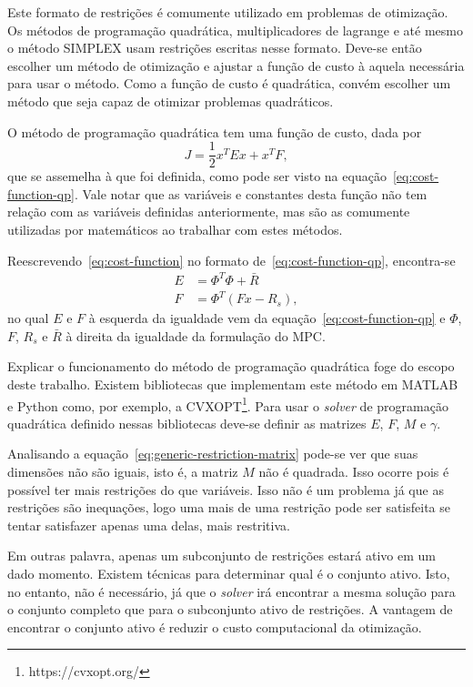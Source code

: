 Este formato de restrições é comumente utilizado em problemas de otimização. Os
métodos de programação quadrática, multiplicadores de lagrange e até mesmo o
método SIMPLEX usam restrições escritas nesse formato. Deve-se então escolher um
método de otimização e ajustar a função de custo à aquela necessária para usar o
método. Como a função de custo é quadrática, convém escolher um método que seja
capaz de otimizar problemas quadráticos.

O método de programação quadrática tem uma função de custo, dada por
%
\begin{equation}
	\label{eq:cost-function-qp}
	J = \frac{1}{2} x^T Ex + x^T F,
\end{equation}
%
que se assemelha à que foi definida, como pode ser visto na
equação~\eqref{eq:cost-function-qp}. Vale notar que as variáveis e constantes
desta função não tem relação com as variáveis definidas anteriormente, mas são
as comumente utilizadas por matemáticos ao trabalhar com estes métodos.

Reescrevendo~\eqref{eq:cost-function} no formato de~\eqref{eq:cost-function-qp},
encontra-se
%
\begin{align}
	\label{eq:cost-function-qp-constants}
	E & = \Phi^T \Phi + \bar{R} \\
	F & = \Phi^T (Fx - R_s),
\end{align}
%
no qual \( E \) e \( F \) à esquerda da igualdade vem da
equação~\eqref{eq:cost-function-qp} e \( \Phi \), \( F \), \( R_s \) e \(\bar{R}
\) à direita da igualdade da formulação do \ac{MPC}.

Explicar o funcionamento do método de programação quadrática foge do escopo
deste trabalho. Existem bibliotecas que implementam este método em MATLAB e
Python como, por exemplo, a CVXOPT\footnote{https://cvxopt.org/}. Para usar o
\textit{solver} de programação quadrática definido nessas bibliotecas deve-se
definir as matrizes \( E \), \( F \), \( M \) e \( \gamma \).

Analisando a equação~\eqref{eq:generic-restriction-matrix} pode-se ver que suas
dimensões não são iguais, isto é, a matriz \( M \) não é quadrada. Isso ocorre
pois é possível ter mais restrições do que variáveis. Isso não é um problema já
que as restrições são inequações, logo uma mais de uma restrição pode ser
satisfeita se tentar satisfazer apenas uma delas, mais restritiva.

Em outras palavra, apenas um subconjunto de restrições estará ativo em um dado
momento. Existem técnicas para determinar qual é o conjunto ativo. Isto, no
entanto, não é necessário, já que o \textit{solver} irá encontrar a mesma
solução para o conjunto completo que para o subconjunto ativo de restrições. A
vantagem de encontrar o conjunto ativo é reduzir o custo computacional da
otimização.

